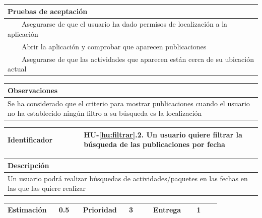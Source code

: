 \documentclass[11pt]{article}
\newcommand{\tabitem}{~~\llap{\textbullet}~~}
\begin{document}
  \begin{longtable}{p{1.028\linewidth}}
    \textbf{Pruebas de aceptación}\\
    \midrule
    \tabitem Asegurarse de que el usuario ha dado permisos de localización a la aplicación\\
    \tabitem Abrir la aplicación y comprobar que aparecen publicaciones\\
    \tabitem Asegurarse de que las actividades que aparecen están cerca de su ubicación actual\\
\end{longtable}
\begin{longtable}{p{1.028\linewidth}}
  \textbf{Observaciones}\\
  \midrule
  Se ha considerado que el criterio para mostrar publicaciones cuando el usuario no ha establecido ningún filtro a su búsqueda es la localización\\
  \bottomrule
  \bottomrule
\end{longtable}

  \centering
  \begin{longtable}{p{0.3\linewidth}|p{0.7\linewidth}}
    \toprule
    \toprule
    \textbf{Identificador} & \textbf{HU-\ref{hu:filtrar}.2}. Un usuario quiere filtrar la búsqueda de las publicaciones por fecha\\
    
    \bottomrule
  \end{longtable}

  \begin{longtable}{p{1.028\linewidth}}
    \textbf{Descripción}\\
    \midrule
    Un usuario podrá realizar búsquedas de actividades/paquetes en las fechas en las que las quiere realizar
  \end{longtable}
  \begin{longtable}{p{0.18\linewidth}|p{0.1\linewidth}|p{0.18\linewidth}|p{0.1\linewidth}|p{0.18\linewidth}|p{0.1\linewidth}}
    \toprule
    \textbf{Estimación} & 0.5 & \textbf{Prioridad} & 3 & \textbf{Entrega} & 1 \\
    \bottomrule
  \end{longtable}
\end{document}

